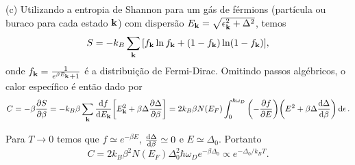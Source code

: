 \documentclass[a4paper,10pt]{article}
\begin{document}
\n

(c) Utilizando a entropia de Shannon para um gás de férmions (partícula ou buraco para cada estado $\vb{k}$) com dispersão $E_{\vb{k}} = \sqrt{\epsilon_{\vb{k}}^2 + \Delta^2}$, temos
$$
S = - k_B \sum_{\vb{k}}
\qty[
f_{\vb{k}} \ln f_{\vb{k}} + (1 - f_{\vb{k}}) \ln(1 - f_{\vb{k}})
],
$$
onde $f_{\vb{k}} = \frac{1}{e^{\beta E_{\vb{k}}} + 1}$ é a distribuição de Fermi-Dirac. Omitindo passos algébricos, o calor específico é então dado por
$$
C = -\beta \pdv{S}{\beta} = - k_B \beta \sum_{\vb{k}} \dv{f}{E_{\vb{k}}}
\qty[E_{\vb{k}}^2 + \beta \Delta \pdv{\Delta}{\beta}] =
2 k_B \beta N(E_F)
\int_0^{\hbar \omega_D} \qty(-\pdv{f}{E})
\qty(E^2 + \beta \Delta \dv{\Delta}{\beta}) \dd{\epsilon}.
$$

Para $T \to 0$ temos que $f \simeq e^{-\beta E}$, $\dv{\Delta}{\beta} \simeq 0$ e $E \simeq \Delta_0$. Portanto
$$
C = 2 k_B \beta^2 N(E_F) \Delta_0^2 \hbar \omega_D e^{-\beta \Delta_0} \propto
e^{-\Delta_0 / k_B T}.
$$
\end{document}
